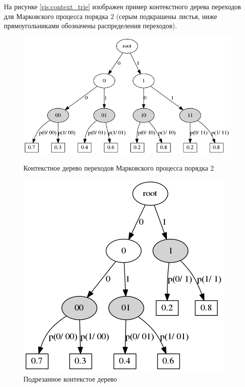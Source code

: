\documentclass{matmex-diploma-custom}
\begin{document}
На рисунке \ref{ris:context_trie} изображен пример контекстного дерева переходов для Марковского процесса порядка $ 2 $ (серым подкрашены листья, ниже прямоугольниками обозначены распределения переходов).
\begin{figure}[h!]\centering
\begin{minipage}[b]{0.49 \textwidth}
	\includegraphics[scale=0.3]{img/Context_trie.png}
	\centering
	\caption{ Контекстное дерево переходов Марковского процесса порядка 2 }
	\label{ris:context_trie}
	
\end{minipage}
\hfil \hfil
\begin{minipage}[b]{0.49 \textwidth}
	\includegraphics[scale=0.3]{img/Prune_c_trie.png}
	\centering
	\caption{ Подрезанное контекстое дерево }
	\label{ris:prune_c_trie}
\end{minipage}
\end{figure}
\end{document}
